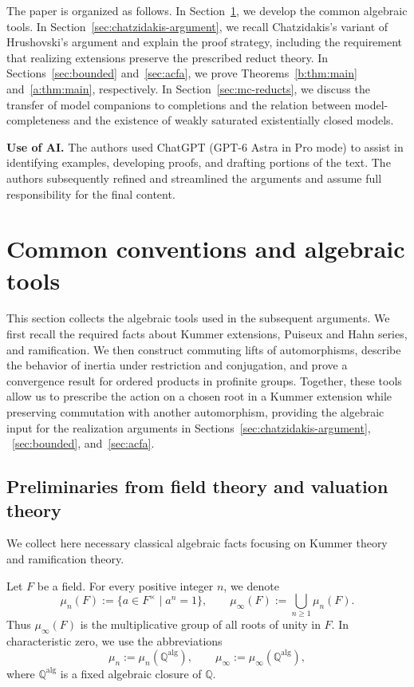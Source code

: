 \documentclass[10pt,a4paper]{amsart}
\renewcommand{\ge}{\geqslant}
\theoremstyle{definition}
\newcommand{\Q}{\mathbb Q}
\newcommand{\alg}{\mathrm{alg}}
\begin{document}
The paper is organized as follows.
In Section~\ref{sec:tools}, we develop the common algebraic tools.
In Section~\ref{sec:chatzidakis-argument}, we recall Chatzidakis's
variant of Hrushovski's argument and explain the proof strategy,
including the requirement that realizing extensions preserve
the prescribed reduct theory.
In Sections~\ref{sec:bounded} and~\ref{sec:acfa}, we prove
Theorems~\ref{b:thm:main} and~\ref{a:thm:main}, respectively.
In Section~\ref{sec:mc-reducts}, we discuss the transfer of model
companions to completions and the
relation between model-completeness and the existence of
weakly saturated existentially closed models.

\medskip
\noindent
\textbf{Use of AI.}
The authors used ChatGPT (GPT-6 Astra in Pro mode) to assist in identifying examples, developing proofs, and drafting portions of the text. The authors subsequently refined and streamlined the arguments and assume full responsibility for the final content.





\section{Common conventions and algebraic tools}\label{sec:tools}
This section collects the algebraic tools used in the subsequent
arguments. We first recall the required facts about 
Kummer extensions, Puiseux and Hahn series, and ramification.
We then construct commuting lifts of automorphisms, describe the
behavior of inertia under restriction and conjugation, and prove
a convergence result for ordered products in profinite groups.
Together, these tools allow us to prescribe the action on a chosen root in a Kummer extension while preserving commutation with another automorphism,
providing the algebraic input for the realization arguments in
Sections~\ref{sec:chatzidakis-argument}, ~\ref{sec:bounded}, and~\ref{sec:acfa}.

\subsection{Preliminaries from field theory and valuation theory}
We collect here necessary classical algebraic facts focusing on Kummer theory and ramification theory.

Let $F$ be a field. For every positive integer $n$, we denote
\[
\mu_n(F):=\{a\in F^\times\mid a^n=1\},
\qquad
\mu_\infty(F):=\bigcup_{n\ge1}\mu_n(F).
\]
Thus $\mu_\infty(F)$ is the multiplicative group of all
roots of unity in $F$. In characteristic zero, we use
the abbreviations
\[
\mu_n:=\mu_n(\Q^{\alg}),
\qquad
\mu_\infty:=\mu_\infty(\Q^{\alg}),
\]
where $\Q^{\alg}$ is a fixed algebraic closure of $\Q$.
\end{document}
